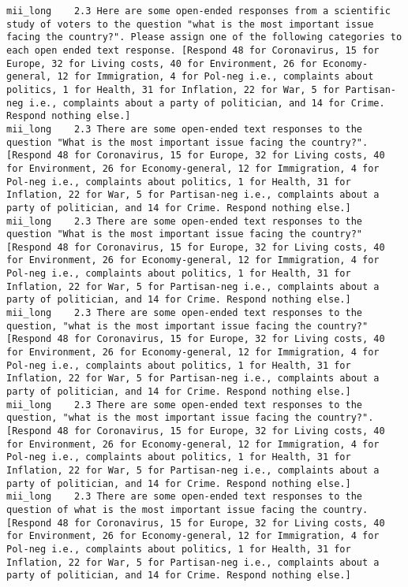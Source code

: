 \begin{lstlisting}[label=lst:promptvariants]
mii_long	2.3	Here are some open-ended responses from a scientific study of voters to the question "what is the most important issue facing the country?". Please assign one of the following categories to each open ended text response. [Respond 48 for Coronavirus, 15 for Europe, 32 for Living costs, 40 for Environment, 26 for Economy-general, 12 for Immigration, 4 for Pol-neg i.e., complaints about politics, 1 for Health, 31 for Inflation, 22 for War, 5 for Partisan-neg i.e., complaints about a party of politician, and 14 for Crime. Respond nothing else.]
mii_long	2.3	There are some open-ended text responses to the question "What is the most important issue facing the country?". [Respond 48 for Coronavirus, 15 for Europe, 32 for Living costs, 40 for Environment, 26 for Economy-general, 12 for Immigration, 4 for Pol-neg i.e., complaints about politics, 1 for Health, 31 for Inflation, 22 for War, 5 for Partisan-neg i.e., complaints about a party of politician, and 14 for Crime. Respond nothing else.]
mii_long	2.3	There are some open-ended text responses to the question "What is the most important issue facing the country?" [Respond 48 for Coronavirus, 15 for Europe, 32 for Living costs, 40 for Environment, 26 for Economy-general, 12 for Immigration, 4 for Pol-neg i.e., complaints about politics, 1 for Health, 31 for Inflation, 22 for War, 5 for Partisan-neg i.e., complaints about a party of politician, and 14 for Crime. Respond nothing else.]
mii_long	2.3	There are some open-ended text responses to the question, "what is the most important issue facing the country?" [Respond 48 for Coronavirus, 15 for Europe, 32 for Living costs, 40 for Environment, 26 for Economy-general, 12 for Immigration, 4 for Pol-neg i.e., complaints about politics, 1 for Health, 31 for Inflation, 22 for War, 5 for Partisan-neg i.e., complaints about a party of politician, and 14 for Crime. Respond nothing else.]
mii_long	2.3	There are some open-ended text responses to the question, "what is the most important issue facing the country?". [Respond 48 for Coronavirus, 15 for Europe, 32 for Living costs, 40 for Environment, 26 for Economy-general, 12 for Immigration, 4 for Pol-neg i.e., complaints about politics, 1 for Health, 31 for Inflation, 22 for War, 5 for Partisan-neg i.e., complaints about a party of politician, and 14 for Crime. Respond nothing else.]
mii_long	2.3	There are some open-ended text responses to the question of what is the most important issue facing the country. [Respond 48 for Coronavirus, 15 for Europe, 32 for Living costs, 40 for Environment, 26 for Economy-general, 12 for Immigration, 4 for Pol-neg i.e., complaints about politics, 1 for Health, 31 for Inflation, 22 for War, 5 for Partisan-neg i.e., complaints about a party of politician, and 14 for Crime. Respond nothing else.]

\end{lstlisting}
